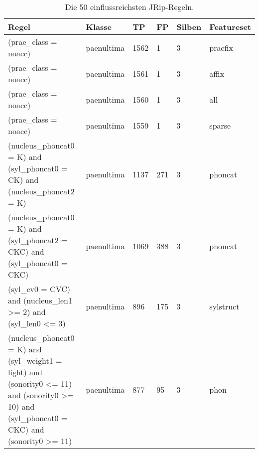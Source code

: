 \begin{table}
\centering
\tiny
\caption{Die 50 einflussreichsten JRip-Regeln.}
\label{table:jrip_rules_examples}
\begin{tabular}{|p{8cm}l|ll|ll|}\hline
{\bf Regel} & {\bf Klasse} & {\bf TP} & {\bf FP} & {\bf Silben} & {\bf Featureset} \\\hline\hline
(prae\_class = noacc)                                                                                                                                                                                        & paenultima & 1562 & 1   & 3 & praefix   \\\hline
(prae\_class = noacc)                                                                                                                                                                                        & paenultima & 1561 & 1   & 3 & affix     \\\hline
(prae\_class = noacc)                                                                                                                                                                                        & paenultima & 1560 & 1   & 3 & all       \\\hline
(prae\_class = noacc)                                                                                                                                                                                        & paenultima & 1559 & 1   & 3 & sparse    \\\hline
(nucleus\_phoncat0 = K) and (syl\_phoncat0 = CK) and (nucleus\_phoncat2 = K)                                                                                                                                 & paenultima & 1137 & 271 & 3 & phoncat   \\\hline
(nucleus\_phoncat0 = K) and (syl\_phoncat2 = CKC) and (syl\_phoncat0 = CKC)                                                                                                                                  & paenultima & 1069 & 388 & 3 & phoncat   \\\hline
(syl\_cv0 = CVC) and (nucleus\_len1 \textgreater= 2) and (syl\_len0 \textless= 3)                                                                                                                            & paenultima & 896  & 175 & 3 & sylstruct \\\hline
(nucleus\_phoncat0 = K) and (syl\_weight1 = light) and (sonority0 \textless= 11) and (sonority0 \textgreater= 10) and (syl\_phoncat0 = CKC) and (sonority0 \textgreater= 11)                                 & paenultima & 877  & 95  & 3 & phon      \\\hline

\end{tabular}
\end{table}
